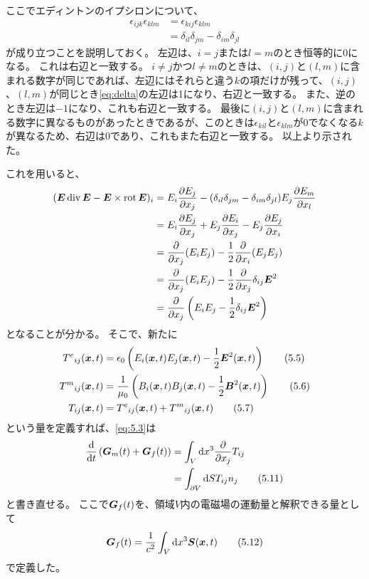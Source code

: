 \documentclass[a4paper]{jsarticle}
\def\vec#1{\mbox{\boldmath $#1$}}
\newcommand{\dif}[2]{\frac{{\rm d} #1}{{\rm d} #2}}
\newcommand{\pdif}[2]{\frac{\partial #1}{\partial #2}}
\newcommand{\ddif}{{\rm d}}
\DeclareMathOperator{\Div}{div}
\DeclareMathOperator{\Rot}{rot}
\begin{document}
ここでエディントンのイプシロンについて、
\begin{align}
	\epsilon_{ijk} \epsilon_{klm} &= \epsilon_{kij} \epsilon_{klm} \\
	&= \delta_{il} \delta_{jm} - \delta_{im} \delta_{jl} \label{eq:delta}
\end{align}
が成り立つことを説明しておく。
左辺は、$i=j$または$l=m$のとき恒等的に0になる。
これは右辺と一致する。
$i \ne j$かつ$l \ne m$のときは、$(i, j)$と$(l, m)$に含まれる数字が同じであれば、左辺にはそれらと違う$k$の項だけが残って、$(i, j)$、$(l, m)$が同じとき\eqref{eq:delta}の左辺は1になり、右辺と一致する。
また、逆のとき左辺は$-1$になり、これも右辺と一致する。
最後に$(i, j)$と$(l, m)$に含まれる数字に異なるものがあったときであるが、このときは$\epsilon_{kil}$と$\epsilon_{klm}$が0でなくなる$k$が異なるため、右辺は0であり、これもまた右辺と一致する。
以上より示された。

これを用いると、
\begin{align}
	(\vec{E} \Div \vec{E} - \vec{E} \times \Rot \vec{E})_i
	&= E_i \pdif{E_j}{x_j} - (\delta_{il} \delta_{jm} - \delta_{im} \delta_{jl}) E_j \pdif{E_m}{x_l} \\
	&= E_i \pdif{E_j}{x_j} + E_j \pdif{E_i}{x_j} - E_j \pdif{E_j}{x_i} \\
	&= \pdif{}{x_j} (E_i E_j) - \frac{1}{2} \pdif{}{x_i} (E_j E_j) \\
	&= \pdif{}{x_j} (E_i E_j) - \frac{1}{2} \pdif{}{x_j} \delta_{ij} \vec{E}^2 \\
	&= \pdif{}{x_j} \left( E_i E_j - \frac{1}{2} \delta_{ij} \vec{E}^2 \right)
\end{align}
となることが分かる。
そこで、新たに
\begin{align}
	{T^e}_{ij}(\vec{x}, t) &= \epsilon_0 \left( E_i(\vec{x}, t) E_j(\vec{x}, t) - \frac{1}{2} \vec{E}^2(\vec{x}, t) \right)
	\tag{5.5} \label{eq:5.5} \\
	{T^m}_{ij}(\vec{x}, t) &= \frac{1}{\mu_0} \left( B_i(\vec{x}, t) B_j(\vec{x}, t) - \frac{1}{2} \vec{B}^2(\vec{x}, t) \right)
	\tag{5.6} \label{eq:5.6} \\
	T_{ij}(\vec{x}, t) &= {T^e}_{ij}(\vec{x}, t) + {T^m}_{ij}(\vec{x}, t)
	\tag{5.7} \label{eq:5.7}
\end{align}
という量を定義すれば、\eqref{eq:5.3}は
\begin{align}
	\dif{}{t} \left( \vec{G}_m(t) + \vec{G}_f(t) \right)
	&=\int_V \ddif x^3 \pdif{}{x_j} T_{ij} \\
	&= \int_{\partial V} \ddif S T_{ij} n_j \tag{5.11} \label{eq:5.11}
\end{align}
と書き直せる。
ここで$\vec{G}_f(t)$を、領域$V$内の電磁場の運動量と解釈できる量として
\begin{align}
	\vec{G}_f(t) = \frac{1}{c^2} \int_V \ddif x^3 \vec{S}(\vec{x}, t)
	\tag{5.12} \label{eq:5.12}
\end{align}
で定義した。
\end{document}
